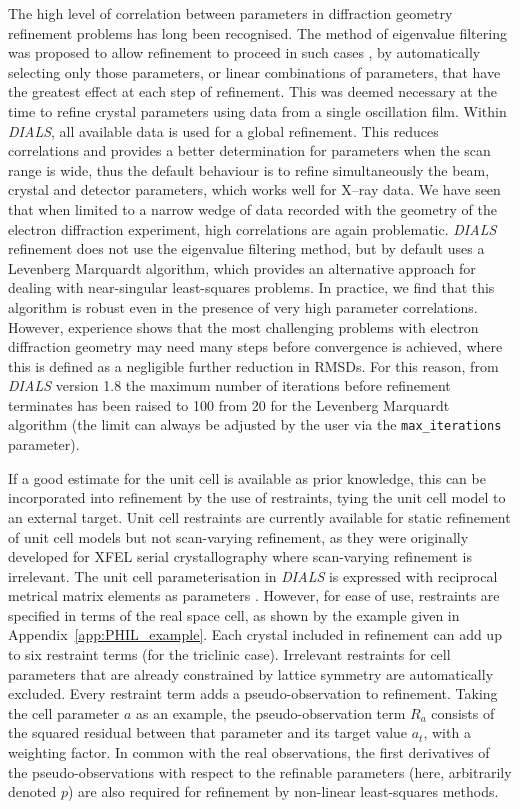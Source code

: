 \documentclass[preprint]{iucr}
\newcommand{\dials}{\emph{DIALS}\xspace}
\newcommand{\code}{\texttt}
\begin{document}
The high level of correlation between parameters in diffraction geometry
refinement problems has long been recognised. The method of eigenvalue
filtering was proposed to allow refinement to proceed in such cases
\cite{Reeke1984,LURE1986phase3}, by automatically selecting only those
parameters, or linear combinations of parameters, that have the greatest effect
at each step of refinement. This was deemed necessary at the time to refine
crystal parameters using data from a single oscillation film. Within \dials,
all available data is used for a global refinement. This reduces correlations
and provides a better determination for parameters when the scan range is wide,
thus the default behaviour is to refine simultaneously the beam, crystal and
detector parameters, which works well for X--ray data. We have seen that when
limited to a narrow wedge of data recorded with the geometry of the electron
diffraction experiment, high correlations are again problematic. \dials
refinement does not use the eigenvalue filtering method, but by default uses a
Levenberg Marquardt algorithm, which provides an alternative approach for
dealing with near-singular least-squares problems. In practice, we find that
this algorithm is robust even in the presence of very high parameter
correlations. However, experience shows that the most challenging problems with
electron diffraction geometry may need many steps before convergence is
achieved, where this is defined as a negligible further reduction in RMSDs. For
this reason, from \dials version 1.8 the maximum number of iterations before
refinement terminates has been raised to 100 from 20 for the Levenberg
Marquardt algorithm (the limit can always be adjusted by the user via the
\code{max\_iterations} parameter).

If a good estimate for the unit cell is available as prior knowledge, this can
be incorporated into refinement by the use of restraints, tying the unit cell
model to an external target. Unit cell restraints are currently available for
static refinement of unit cell models but not scan-varying refinement, as they
were originally developed for XFEL serial crystallography where scan-varying
refinement is irrelevant. The unit cell parameterisation in \dials is expressed
with reciprocal metrical matrix elements as parameters \cite{Waterman2016}.
However, for ease of use, restraints are specified in terms of the real space
cell, as shown by the example given in Appendix~\ref{app:PHIL_example}. Each
crystal included in refinement can add up to six restraint terms (for the
triclinic case). Irrelevant restraints for cell parameters that are already
constrained by lattice symmetry are automatically excluded. Every restraint
term adds a pseudo-observation to refinement. Taking the cell parameter $a$ as
an example, the pseudo-observation term $R_a$ consists of the squared residual
between that parameter and its target value $a_t$, with a weighting factor. In
common with the real observations, the first derivatives of the
pseudo-observations with respect to the refinable parameters (here, arbitrarily
denoted $p$) are also required for refinement by non-linear least-squares
methods.
\end{document}
